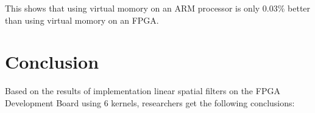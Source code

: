 
This shows that using virtual momory on an ARM processor is only 0.03\% better than using virtual momory on an FPGA.

\section{Conclusion}


Based on the results of implementation linear spatial filters on the FPGA Development Board using 6 kernels, researchers get the following conclusions:
